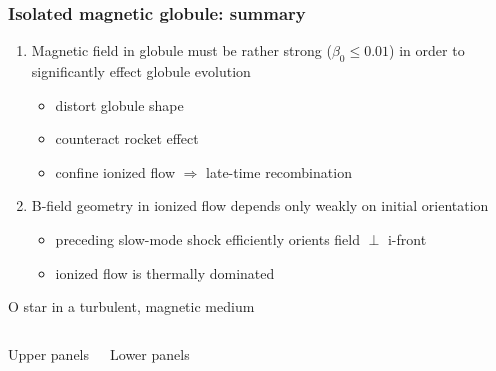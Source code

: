 \documentclass{beamer}
\begin{document}
\begin{frame}
  \frametitle{Isolated magnetic globule: summary}
  \linespread{1.3}\selectfont
  \begin{enumerate}
  \item Magnetic field in globule must be rather strong ($\beta_0 \le
    0.01$) in order to significantly effect globule evolution
    \begin{itemize}
    \item distort globule shape
    \item counteract rocket effect
    \item confine ionized flow $\Rightarrow$ late-time recombination
    \end{itemize}
  \item B-field geometry in ionized flow depends only weakly on
    initial orientation
    \begin{itemize}
    \item preceding slow-mode shock efficiently orients field $\perp$ i-front
    \item ionized flow is thermally dominated
    \end{itemize}
  \end{enumerate}
\end{frame}


\begin{frame}{O star in a turbulent, magnetic medium}
  \begin{columns}
    \begin{block}{Upper panels}
      \color{red}{[N\,II]}\quad
      \color{green}{H\large\bfseries\begin{greek}a\end{greek}}\quad
      \color{blue}{[O\,III]}
    \end{block}
    \begin{block}{Lower panels}
      \color{red}{FIR Cold dust}\\
      \color{green}{MIR Warm~PAHs}\\
      \color{blue}{Radio Free-free}
    \end{block}
  \end{columns}
\end{frame}
\end{document}

